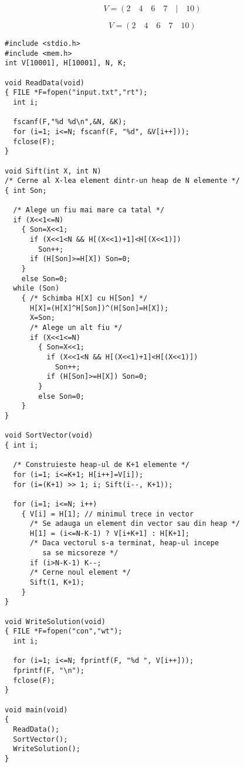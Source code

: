 
\begin{equation*}
  V = (2 \quad 4 \quad 6 \quad 7 \quad | \quad 10)
\end{equation*}


\begin{equation*}
  V = (2 \quad 4 \quad 6 \quad 7 \quad 10)
\end{equation*}

\begin{verbatim}
#include <stdio.h>
#include <mem.h>
int V[10001], H[10001], N, K;

void ReadData(void)
{ FILE *F=fopen("input.txt","rt");
  int i;

  fscanf(F,"%d %d\n",&N, &K);
  for (i=1; i<=N; fscanf(F, "%d", &V[i++]));
  fclose(F);
}

void Sift(int X, int N)
/* Cerne al X-lea element dintr-un heap de N elemente */
{ int Son;

  /* Alege un fiu mai mare ca tatal */
  if (X<<1<=N)
    { Son=X<<1;
      if (X<<1<N && H[(X<<1)+1]<H[(X<<1)])
        Son++;
      if (H[Son]>=H[X]) Son=0;
    }
    else Son=0;
  while (Son)
    { /* Schimba H[X] cu H[Son] */
      H[X]=(H[X]^H[Son])^(H[Son]=H[X]);
      X=Son;
      /* Alege un alt fiu */
      if (X<<1<=N)
        { Son=X<<1;
          if (X<<1<N && H[(X<<1)+1]<H[(X<<1)])
            Son++;
          if (H[Son]>=H[X]) Son=0;
        }
        else Son=0;
    }
}

void SortVector(void)
{ int i;

  /* Construieste heap-ul de K+1 elemente */
  for (i=1; i<=K+1; H[i++]=V[i]);
  for (i=(K+1) >> 1; i; Sift(i--, K+1));

  for (i=1; i<=N; i++)
    { V[i] = H[1]; // minimul trece in vector
      /* Se adauga un element din vector sau din heap */
      H[1] = (i<=N-K-1) ? V[i+K+1] : H[K+1];
      /* Daca vectorul s-a terminat, heap-ul incepe
         sa se micsoreze */
      if (i>N-K-1) K--;
      /* Cerne noul element */
      Sift(1, K+1);
    }
}

void WriteSolution(void)
{ FILE *F=fopen("con","wt");
  int i;

  for (i=1; i<=N; fprintf(F, "%d ", V[i++]));
  fprintf(F, "\n");
  fclose(F);
}

void main(void)
{
  ReadData();
  SortVector();
  WriteSolution();
}
\end{verbatim}
